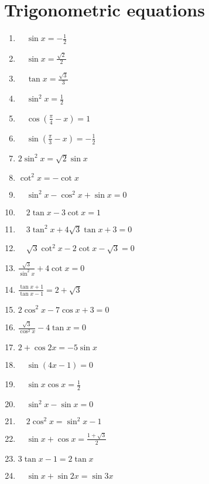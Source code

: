 \documentclass[10pt]{article}
\begin{document}
\section{ Trigonometric equations}
\begin{enumerate}
    \item  $\quad \sin x=-\frac{1}{2}$\\
    \item  $\quad \sin x=\frac{\sqrt{2}}{2}$\\
    \item  $\quad \tan x=\frac{\sqrt{3}}{3}$\\
    \item  $\quad \sin ^2 x=\frac{1}{2}$\\
    \item  $\quad \cos \left(\frac{\pi}{4}-x\right)=1$\\
    \item  $\quad \sin \left(\frac{\pi}{3}-x\right)=-\frac{1}{2}$\\
    \item  $2 \sin ^2 x=\sqrt{2} \sin x$\\
    \item  $\cot ^2 x=-\cot x$\\
    \item  $\quad \sin ^2 x-\cos ^2 x+\sin x=0$\\
    \item  $\quad 2 \tan x-3 \cot x=1$\\
    \item  $\quad 3 \tan ^2 x+4 \sqrt{3} \tan x+3=0$\\
    \item  $\quad \sqrt{3} \cot ^2 x-2 \cot x-\sqrt{3}=0$\\
    \item  $\frac{\sqrt{3}}{\sin ^2 x}+4 \cot x=0$\\
    \item  $\frac{\tan x+1}{\tan x-1}=2+\sqrt{3}$\\
    \item  $2 \cos ^2 x-7 \cos x+3=0$\\
    \item  $\frac{\sqrt{3}}{\cos ^2 x}-4 \tan x=0$\\
    \item  $2+\cos 2 x=-5 \sin x$\\ 
    \item  $\quad \sin (4 x-1)=0$\\
    \item  $\quad \sin x \cos x=\frac{1}{2}$\\
    \item  $\quad \sin ^2 x-\sin x=0$\\
    \item  $\quad 2 \cos ^2 x=\sin ^2 x-1$\\ 
    \item  $\quad \sin x+\cos x=\frac{1+\sqrt{3}}{2}$\\
    \item  $3 \tan x-1=2 \tan x$\\
    \item  $\quad \sin x+\sin 2 x=\sin 3 x$
\end{enumerate}
\end{document}
